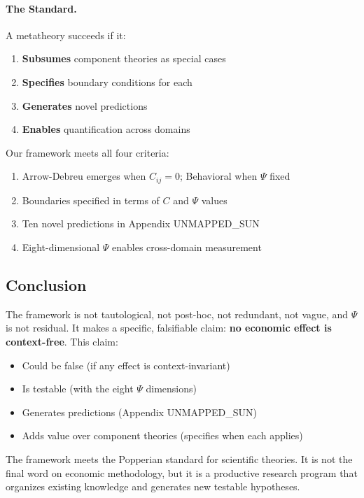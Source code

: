 \paragraph{The Standard.}
A metatheory succeeds if it:
\begin{enumerate}
    \item \textbf{Subsumes} component theories as special cases
    \item \textbf{Specifies} boundary conditions for each
    \item \textbf{Generates} novel predictions
    \item \textbf{Enables} quantification across domains
\end{enumerate}

Our framework meets all four criteria:
\begin{enumerate}
    \item Arrow-Debreu emerges when $C_{ij} = 0$; Behavioral when $\Psi$ fixed
    \item Boundaries specified in terms of $C$ and $\Psi$ values
    \item Ten novel predictions in Appendix UNMAPPED_SUN
    \item Eight-dimensional $\Psi$ enables cross-domain measurement
\end{enumerate}

\subsection{Conclusion}

The framework is not tautological, not post-hoc, not redundant, not vague, and $\Psi$ is not residual. It makes a specific, falsifiable claim: \textbf{no economic effect is context-free}. This claim:

\begin{itemize}
    \item Could be false (if any effect is context-invariant)
    \item Is testable (with the eight $\Psi$ dimensions)
    \item Generates predictions (Appendix UNMAPPED_SUN)
    \item Adds value over component theories (specifies when each applies)
\end{itemize}

The framework meets the Popperian standard for scientific theories. It is not the final word on economic methodology, but it is a productive research program that organizes existing knowledge and generates new testable hypotheses.

